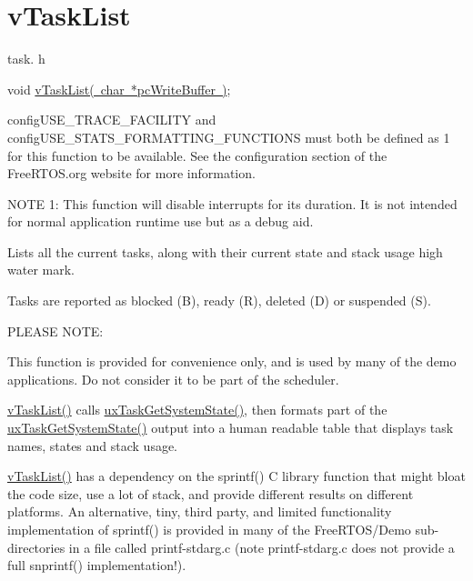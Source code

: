 \hypertarget{group__v_task_list}{}\section{v\+Task\+List}
\label{group__v_task_list}
task. h 
\begin{DoxyPre}void \mbox{\hyperlink{task_8h_ab87abc717f34ddced76802d12588a93d}{vTaskList( char *pcWriteBuffer )}};\end{DoxyPre}


config\+U\+S\+E\+\_\+\+T\+R\+A\+C\+E\+\_\+\+F\+A\+C\+I\+L\+I\+TY and config\+U\+S\+E\+\_\+\+S\+T\+A\+T\+S\+\_\+\+F\+O\+R\+M\+A\+T\+T\+I\+N\+G\+\_\+\+F\+U\+N\+C\+T\+I\+O\+NS must both be defined as 1 for this function to be available. See the configuration section of the Free\+R\+T\+O\+S.\+org website for more information.

N\+O\+TE 1\+: This function will disable interrupts for its duration. It is not intended for normal application runtime use but as a debug aid.

Lists all the current tasks, along with their current state and stack usage high water mark.

Tasks are reported as blocked (\textquotesingle{}B\textquotesingle{}), ready (\textquotesingle{}R\textquotesingle{}), deleted (\textquotesingle{}D\textquotesingle{}) or suspended (\textquotesingle{}S\textquotesingle{}).

P\+L\+E\+A\+SE N\+O\+TE\+:

This function is provided for convenience only, and is used by many of the demo applications. Do not consider it to be part of the scheduler.

\mbox{\hyperlink{task_8h_ab87abc717f34ddced76802d12588a93d}{v\+Task\+List()}} calls \mbox{\hyperlink{task_8h_aa4603f3de3d809e9beb18d10fbac005d}{ux\+Task\+Get\+System\+State()}}, then formats part of the \mbox{\hyperlink{task_8h_aa4603f3de3d809e9beb18d10fbac005d}{ux\+Task\+Get\+System\+State()}} output into a human readable table that displays task names, states and stack usage.

\mbox{\hyperlink{task_8h_ab87abc717f34ddced76802d12588a93d}{v\+Task\+List()}} has a dependency on the sprintf() C library function that might bloat the code size, use a lot of stack, and provide different results on different platforms. An alternative, tiny, third party, and limited functionality implementation of sprintf() is provided in many of the Free\+R\+T\+O\+S/\+Demo sub-\/directories in a file called printf-\/stdarg.\+c (note printf-\/stdarg.\+c does not provide a full snprintf() implementation!).

